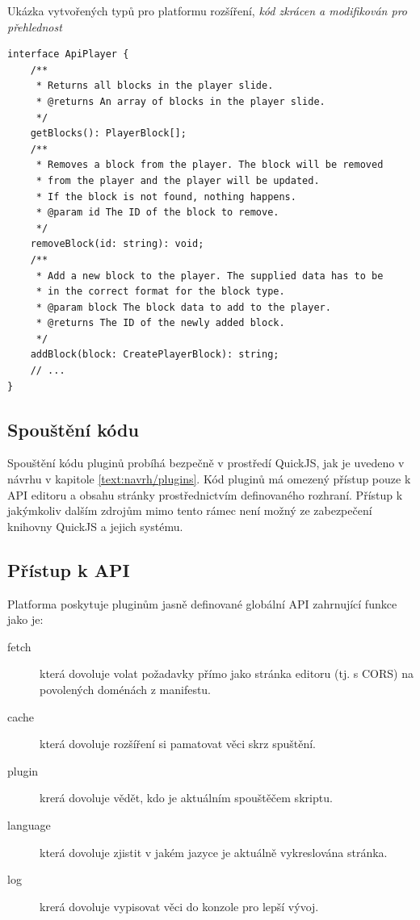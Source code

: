 \begin{listing}[ht!]
\caption[Ukázka vytvořených typů pro platformu rozšíření]{Ukázka vytvořených typů pro platformu rozšíření, \textit{kód zkrácen a modifikován pro přehlednost}}\label{code:realizace/typy}
\begin{verbatim}
interface ApiPlayer {
    /**
     * Returns all blocks in the player slide.
     * @returns An array of blocks in the player slide.
     */
    getBlocks(): PlayerBlock[];
    /**
     * Removes a block from the player. The block will be removed 
     * from the player and the player will be updated.
     * If the block is not found, nothing happens.
     * @param id The ID of the block to remove.
     */
    removeBlock(id: string): void;
    /**
     * Add a new block to the player. The supplied data has to be
     * in the correct format for the block type.
     * @param block The block data to add to the player.
     * @returns The ID of the newly added block.
     */
    addBlock(block: CreatePlayerBlock): string;
    // ...
}
\end{verbatim}
\end{listing}

\subsection{Spouštění kódu}

Spouštění kódu pluginů probíhá bezpečně v prostředí QuickJS, jak je uvedeno v návrhu v kapitole \ref{text:navrh/plugins}. 
Kód pluginů má omezený přístup pouze k API editoru a obsahu stránky prostřednictvím definovaného rozhraní. 
Přístup k jakýmkoliv dalším zdrojům mimo tento rámec není možný ze zabezpečení knihovny QuickJS a jejich systému.

\subsection{Přístup k API}

Platforma poskytuje pluginům jasně definované globální API zahrnující funkce jako je:

\begin{description}
    \item[fetch] která dovoluje volat požadavky přímo jako stránka editoru (tj. s CORS) na povolených doménách z manifestu.
    \item[cache] která dovoluje rozšíření si pamatovat věci skrz spuštění.
    \item[plugin] krerá dovoluje vědět, kdo je aktuálním spouštěčem skriptu.
    \item[language] která dovoluje zjistit v jakém jazyce je aktuálně vykreslována stránka.
    \item[log] krerá dovoluje vypisovat věci do konzole pro lepší vývoj.
\end{description}

